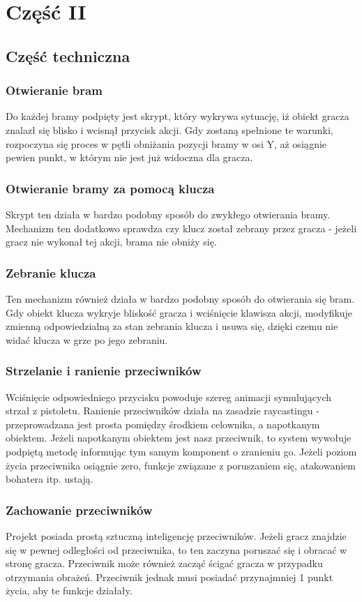 \documentclass[12pt,a4paper]{article}
\newcommand{\si}{ś}
\begin{document}
	\section*{Część II}
	\subsection*{Część techniczna}
	\subsubsection*{Otwieranie bram}
	Do każdej bramy podpięty jest skrypt, który wykrywa sytuację, iż obiekt gracza znalazł się blisko i wcisnął przycisk akcji. Gdy zostaną spełnione te warunki, rozpoczyna się proces w pętli obniżania pozycji bramy w osi Y, aż osiągnie pewien punkt, w którym nie jest już widoczna dla gracza. \\
	\subsubsection*{Otwieranie bramy za pomocą klucza}
	Skrypt ten działa w bardzo podobny sposób do zwykłego otwierania bramy. Mechanizm ten dodatkowo sprawdza czy klucz został zebrany przez gracza - jeżeli gracz nie wykonał tej akcji, brama nie obniży się.
	
	\subsubsection*{Zebranie klucza} 
	Ten mechanizm również działa w bardzo podobny sposób do otwierania się bram. Gdy obiekt klucza wykryje blisko\si ć gracza i wci\si nięcie klawisza akcji, modyfikuje zmienną odpowiedzialną za stan zebrania klucza i usuwa się, dzięki czemu nie widać klucza w grze po jego zebraniu.
	
	\subsubsection*{Strzelanie i ranienie przeciwników} 
	Wci\si nięcie odpowiedniego przycisku powoduje szereg animacji symulujących strzał z pistoletu. Ranienie przeciwników działa na zasadzie raycastingu - przeprowadzana jest prosta pomiędzy \si rodkiem celownika, a napotkanym obiektem. Jeżeli napotkanym obiektem jest nasz przeciwnik, to system wywołuje podpiętą metodę informując tym samym komponent o zranieniu go. Jeżeli poziom życia przeciwnika osiągnie zero, funkcje związane z poruszaniem się, atakowaniem bohatera itp. ustają.
	\subsubsection*{Zachowanie przeciwników} 
	Projekt posiada prostą sztuczną inteligencję przeciwników. Jeżeli gracz znajdzie się w pewnej odległo\si ci od przeciwnika, to ten zaczyna poruszać się i obracać w stronę gracza. Przeciwnik może również zacząć \si cigać gracza w przypadku otrzymania obrażeń. Przeciwnik jednak musi posiadać przynajmniej 1 punkt życia, aby te funkcje działały. 
\end{document}
